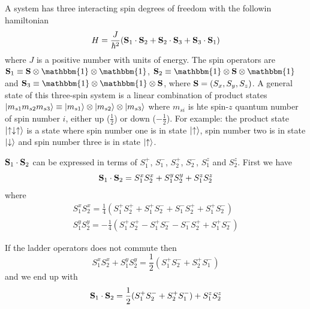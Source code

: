 \documentclass{article}
\begin{document}
\subsection{}
A system has three interacting spin degrees of freedom with the followin hamiltonian
\begin{equation}
H = \frac{J}{\hbar^2}(\vb{S}_1\cdot\vb{S}_2 + \vb{S}_2\cdot\vb{S}_3 + \vb{S}_3\cdot\vb{S}_1)
\end{equation}
where $J$ is a positive number with units of energy. The spin operators are $\vb{S}_1\equiv \vb{S}\otimes\mathbbm{1}\otimes\mathbbm{1}$, $\vb{S}_2\equiv \mathbbm{1}\otimes\vb{S}\otimes\mathbbm{1}$ and $\vb{S}_3\equiv \mathbbm{1}\otimes\mathbbm{1}\otimes\vb{S}$, where $\vb{S}=(S_x,S_y,S_z)$. A general state of this three-spin system is a linear combination of product states $\ket{m_{s1}m_{s2}m_{s3}}\equiv\ket{m_{s1}}\otimes\ket{m_{s2}}\otimes\ket{m_{s3}}$ where $m_{si}$ is hte spin-$z$ quantum number of spin number $i$, either up ($\frac{1}{2}$) or down ($-\frac{1}{2}$). For example: the product state $\ket{\uparrow\downarrow\uparrow}$ is a state where spin number one is in state $\ket{\uparrow}$, spin number two is in state $\ket{\downarrow}$ and spin number three is in state $\ket{\uparrow}$.

$\vb{S}_1\cdot\vb{S}_2$ can be expressed in terms of $S_1^+$, $S_1^-$, $S_2^+$, $S_2^-$, $S_1^z$ and $S_2^z$. First we have
\begin{equation*}
\vb{S}_1\cdot\vb{S}_2=S_1^xS_2^x + S_1^yS_2^y + S_1^zS_2^z
\end{equation*}
where
\begin{align*}
S_1^xS_2^x= \frac{1}{4}(S_1^+S_2^+ +S_1^+S_2^- + S_1^-S_2^+ + S_1^+S_2^-)\\
S_1^yS_2^y=-\frac{1}{4}(S_1^+S_2^+ -S_1^+S_2^- - S_1^-S_2^+ + S_1^+S_2^-)
\end{align*}

If the ladder operators does not commute then
\begin{equation*}
S_1^xS_2^x + S_1^yS_2^y = \frac{1}{2}(S_1^+S_2^- + S_2^+S_1^-)
\end{equation*}
and we end up with
\begin{equation}
\vb{S}_1\cdot\vb{S}_2 = \frac{1}{2}(S_1^+S_2^- + S_2^+S_1^-) + S_1^zS_2^z
\end{equation}
\end{document}
